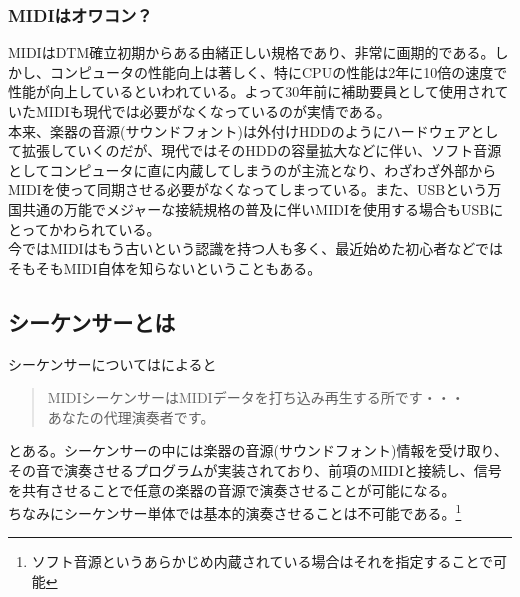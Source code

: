 \documentclass[ams]{U-AizuGT}
\begin{document}
\subsubsection{MIDIはオワコン？}
MIDIはDTM確立初期からある由緒正しい規格であり、非常に画期的である。しかし、コンピュータの性能向上は著しく、特にCPUの性能は2年に10倍の速度で性能が向上しているといわれている。よって30年前に補助要員として使用されていたMIDIも現代では必要がなくなっているのが実情である。\\
本来、楽器の音源(サウンドフォント)は外付けHDDのようにハードウェアとして拡張していくのだが、現代ではそのHDDの容量拡大などに伴い、ソフト音源としてコンピュータに直に内蔵してしまうのが主流となり、わざわざ外部からMIDIを使って同期させる必要がなくなってしまっている。また、USBという万国共通の万能でメジャーな接続規格の普及に伴いMIDIを使用する場合もUSBにとってかわられている。\\
今ではMIDIはもう古いという認識を持つ人も多く、最近始めた初心者などではそもそもMIDI自体を知らないということもある。\\
\subsection{シーケンサーとは}
シーケンサーについては\cite{yoridokoro}によると
\begin{quote}
  MIDIシーケンサーはMIDIデータを打ち込み再生する所です・・・\\
  あなたの代理演奏者です。\\
\end{quote}
とある。シーケンサーの中には楽器の音源(サウンドフォント)情報を受け取り、その音で演奏させるプログラムが実装されており、前項のMIDIと接続し、信号を共有させることで任意の楽器の音源で演奏させることが可能になる。\\
ちなみにシーケンサー単体では基本的演奏させることは不可能である。\footnote{ソフト音源というあらかじめ内蔵されている場合はそれを指定することで可能}\\
\end{document}
